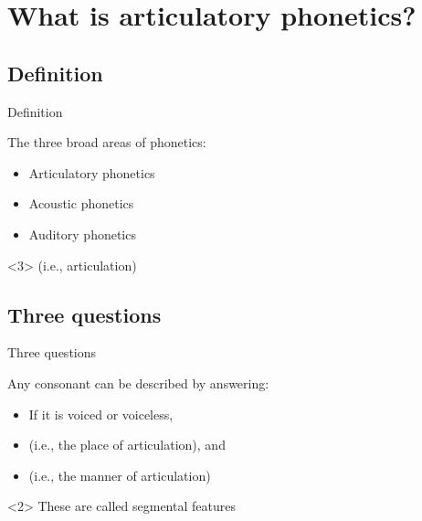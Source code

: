 \documentclass{beamer}
\subtitle[Consonant Articulation]{Articulation of English Consonants}
\newcommand{\suboneone}{Definition}
\newcommand{\subonetwo}{Three questions}
\begin{document}
  

  \section{What is articulatory phonetics?}
    \subsection{\suboneone}
      \begin{frame}{\suboneone}
        \begin{block}{}
          The three broad areas of phonetics:
          \begin{itemize}
            \item \alert<2->{Articulatory phonetics}
            \item Acoustic phonetics
            \item Auditory phonetics
          \end{itemize}
        \end{block}
        \begin{definition}<3>
           (i.e., \alert{articulation})
        \end{definition}
      \end{frame}

    \subsection{\subonetwo}
      \begin{frame}{\subonetwo}
        \begin{block}{}
          Any consonant can be described by answering:
          \begin{itemize}
            \item If it is \alert{voiced} or \alert{voiceless},
            \item  (i.e., the \alert{place of articulation}), and
            \item  (i.e., the \alert{manner of articulation})
          \end{itemize}
        \end{block}
        \begin{alertblock}<2>{}
          These are called \alert{segmental features}
        \end{alertblock}
      \end{frame}
\end{document}
